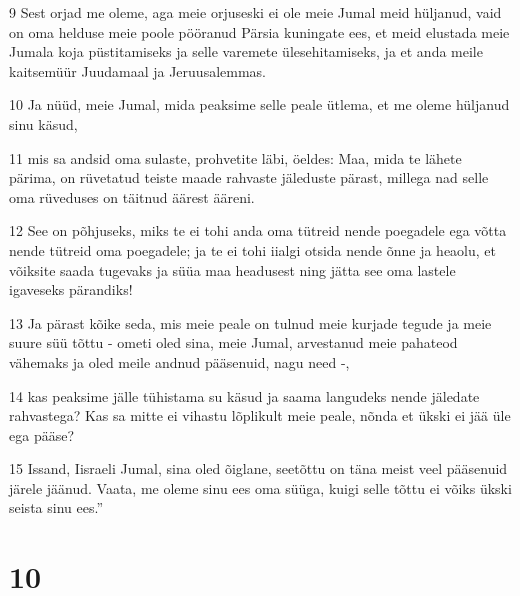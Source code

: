 \par 9 Sest orjad me oleme, aga meie orjuseski ei ole meie Jumal meid hüljanud, vaid on oma helduse meie poole pööranud Pärsia kuningate ees, et meid elustada meie Jumala koja püstitamiseks ja selle varemete ülesehitamiseks, ja et anda meile kaitsemüür Juudamaal ja Jeruusalemmas.
\par 10 Ja nüüd, meie Jumal, mida peaksime selle peale ütlema, et me oleme hüljanud sinu käsud,
\par 11 mis sa andsid oma sulaste, prohvetite läbi, öeldes: Maa, mida te lähete pärima, on rüvetatud teiste maade rahvaste jäleduste pärast, millega nad selle oma rüveduses on täitnud äärest ääreni.
\par 12 See on põhjuseks, miks te ei tohi anda oma tütreid nende poegadele ega võtta nende tütreid oma poegadele; ja te ei tohi iialgi otsida nende õnne ja heaolu, et võiksite saada tugevaks ja süüa maa headusest ning jätta see oma lastele igaveseks pärandiks!
\par 13 Ja pärast kõike seda, mis meie peale on tulnud meie kurjade tegude ja meie suure süü tõttu - ometi oled sina, meie Jumal, arvestanud meie pahateod vähemaks ja oled meile andnud pääsenuid, nagu need -,
\par 14 kas peaksime jälle tühistama su käsud ja saama langudeks nende jäledate rahvastega? Kas sa mitte ei vihastu lõplikult meie peale, nõnda et ükski ei jää üle ega pääse?
\par 15 Issand, Iisraeli Jumal, sina oled õiglane, seetõttu on täna meist veel pääsenuid järele jäänud. Vaata, me oleme sinu ees oma süüga, kuigi selle tõttu ei võiks ükski seista sinu ees.”

\chapter{10}

